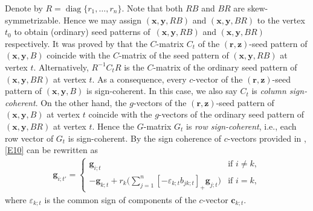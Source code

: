 \documentclass[pdftex]{sigma}
\numberwithin{equation}{section}
\begin{document}
Denote by $R=\operatorname{diag}\{r_1,\dots,r_n\}$. Note that both $RB$ and $BR$ are skew-symmetrizable. Hence we may assign $(\mathbf{x},\mathbf{y}, RB)$ and $(\mathbf{x},\mathbf{y},BR)$ to the vertex $t_0$ to obtain (ordinary) seed patterns of~$(\mathbf{x},\mathbf{y}, RB)$ and $(\mathbf{x},\mathbf{y},BR)$ respectively.
It was proved by \cite[Proposition 3.9]{Nakanishi14} that the $C$-matrix $C_t$ of the $(\mathbf{r},\mathbf{z})$-seed pattern of $(\mathbf{x},\mathbf{y}, B)$ coincide with the $C$-matrix of the seed pattern of $(\mathbf{x},\mathbf{y}, RB)$ at vertex $t$. Alternatively, $R^{-1}C_tR$ is the $C$-matrix of the ordinary seed pattern of $(\mathbf{x},\mathbf{y}, BR)$ at vertex $t$. As a consequence, every $c$-vector of the $(\mathbf{r},\mathbf{z})$-seed pattern of $(\mathbf{x},\mathbf{y}, B)$ is sign-coherent. In this case, we also say $C_t$ is {\it column sign-coherent}. On the other hand, the $g$-vectors of the $(\mathbf{r},\mathbf{z})$-seed pattern of $(\mathbf{x},\mathbf{y}, B)$ at vertex $t$ coincide with the $g$-vectors of the ordinary seed pattern of $(\mathbf{x},\mathbf{y},BR)$ at vertex $t$. Hence the $G$-matrix $G_t$ is {\it row sign-coherent}, i.e., each row vector of $G_t$ is sign-coherent.
By the sign coherence of $c$-vectors provided in \cite[Corollary 5.5]{GHKK2018}, \eqref{E10} can be rewritten as
\begin{align}\label{E15}
\mathbf{g}_{i;t'}=\begin{cases}\mathbf{g}_{i;t}& \text{if $i\neq k$},\\
 \displaystyle-\mathbf{g}_{k;t}+r_k\biggl(\sum\limits_{j=1}^{n}[-\varepsilon_{k;t} b_{jk;t}]_+\mathbf{g}_{j;t}\biggr)& \text{if $i=k$},
 \end{cases}
\end{align}
where $\varepsilon_{k;t}$ is the common sign of components of the $c$-vector $\mathbf{c}_{k;t}$.
\end{document}
